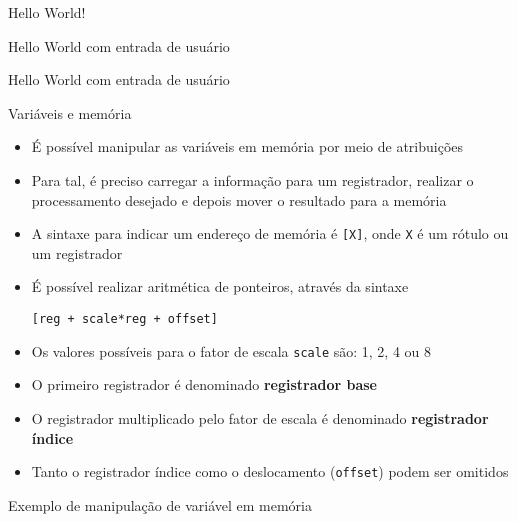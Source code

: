 \begin{frame}[fragile]{Hello World!}
\end{frame}

\begin{frame}[fragile]{Hello World com entrada de usuário}
\end{frame}

\begin{frame}[fragile]{Hello World com entrada de usuário}
\end{frame}

\begin{frame}[fragile]{Variáveis e memória}

    \begin{itemize}
        \item É possível manipular as variáveis em memória por meio de atribuições

        \item Para tal, é preciso carregar a informação para um registrador, realizar o
            processamento desejado e depois mover o resultado para a memória

        \item A sintaxe para indicar um endereço de memória é \texttt{[X]}, onde 
            \texttt{X} é um rótulo ou um registrador

        \item É possível realizar aritmética de ponteiros, através da sintaxe
        \begin{center}
            \texttt{[reg + scale*reg + offset]}
        \end{center}

        \item Os valores possíveis para o fator de escala \texttt{scale} são: 1, 2, 4 ou 8

        \item O primeiro registrador é denominado \textbf{registrador base}

        \item O registrador multiplicado pelo fator de escala é denominado \textbf{registrador 
            índice}

        \item Tanto o registrador índice como o deslocamento (\texttt{offset}) podem ser omitidos
    \end{itemize}

\end{frame}

\begin{frame}[fragile]{Exemplo de manipulação de variável em memória}
\end{frame}
